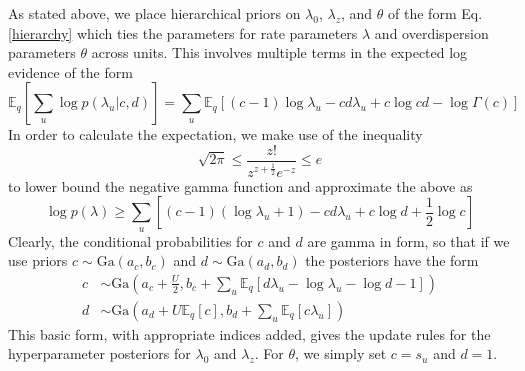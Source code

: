 \documentclass{article} %
\begin{document}
As stated above, we place hierarchical priors on $\lambda_0$, $\lambda_z$, and $\theta$ of the form Eq. \ref{hierarchy} which ties the parameters for rate parameters $\lambda$ and overdispersion parameters $\theta$ across units.  This involves multiple terms in the expected log evidence of the form
\begin{equation}
    \mathbb{E}_q \left[\sum_u \log p(\lambda_u|c, d)\right] = \sum_u \mathbb{E}_q \left[ 
    (c - 1) \log \lambda_u - cd\lambda_u + c \log cd - \log \Gamma(c) 
    \right] 
\end{equation}
In order to calculate the expectation, we make use of the inequality %
\begin{equation}
    \sqrt{2\pi} \le \frac{z!}{z^{z+\frac{1}{2}} e^{-z}} \le e
\end{equation}
to lower bound the negative gamma function and approximate the above as
\begin{equation}
    \log p(\lambda) \ge \sum_u \left[ 
    (c - 1) (\log \lambda_u + 1) - cd\lambda_u + c \log d + \frac{1}{2}\log c\right]
\end{equation}
Clearly, the conditional probabilities for $c$ and $d$ are gamma in form, so that if we use priors $c \sim \text{Ga}(a_c, b_c)$ and $d\sim \text{Ga}(a_d, b_d)$ the posteriors have the form
\begin{align}
    c &\sim \text{Ga}\left(a_c + \frac{U}{2}, 
    b_c + \sum_u\mathbb{E}_q 
        \left[d \lambda_u - \log \lambda_u - \log d - 1\right]\right) \\
    d &\sim \text{Ga}\left(
        a_d + U\mathbb{E}_q[c], b_d + \sum_u \mathbb{E}_q [c \lambda_u]
    \right)
\end{align}
This basic form, with appropriate indices added, gives the update rules for the hyperparameter posteriors for $\lambda_0$ and $\lambda_z$. For $\theta$, we simply set $c = s_u$ and $d = 1$.
\end{document}
